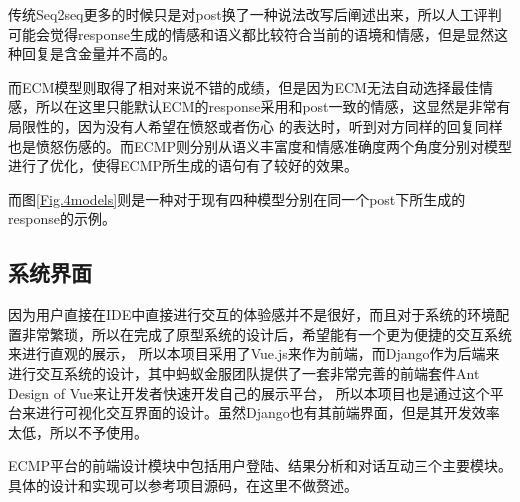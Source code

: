 \documentclass[supercite]{HustGraduPaper}
\theoremstyle{definition}
\begin{document}
传统Seq2seq更多的时候只是对post换了一种说法改写后阐述出来，所以人工评判可能会觉得response生成的情感和语义都比较符合当前的语境和情感，但是显然这种回复是含金量并不高的。

而ECM模型则取得了相对来说不错的成绩，但是因为ECM无法自动选择最佳情感，所以在这里只能默认ECM的response采用和post一致的情感，这显然是非常有局限性的，因为没有人希望在愤怒或者伤心
的表达时，听到对方同样的回复同样也是愤怒伤感的。而ECMP则分别从语义丰富度和情感准确度两个角度分别对模型进行了优化，使得ECMP所生成的语句有了较好的效果。

而图\ref{Fig.4models}则是一种对于现有四种模型分别在同一个post下所生成的response的示例。

\subsection{系统界面}
因为用户直接在IDE中直接进行交互的体验感并不是很好，而且对于系统的环境配置非常繁琐，所以在完成了原型系统的设计后，希望能有一个更为便捷的交互系统来进行直观的展示，
所以本项目采用了Vue.js来作为前端，而Django作为后端来进行交互系统的设计，其中蚂蚁金服团队提供了一套非常完善的前端套件Ant Design of Vue来让开发者快速开发自己的展示平台，
所以本项目也是通过这个平台来进行可视化交互界面的设计。虽然Django也有其前端界面，但是其开发效率太低，所以不予使用。

ECMP平台的前端设计模块中包括用户登陆、结果分析和对话互动三个主要模块。具体的设计和实现可以参考项目源码\cite{ECMP}，在这里不做赘述。
\end{document}
